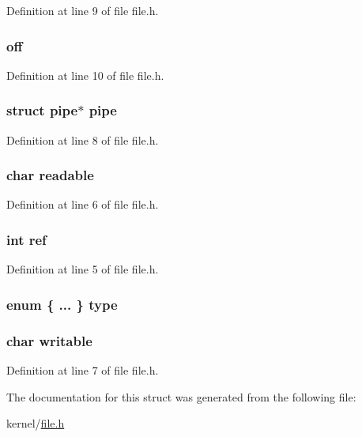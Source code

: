Definition at line 9 of file file.\-h.

\hypertarget{structfile_a1aeb2e4b0cfd549f8fb46fb7e08f7e3e}{
\subsubsection[{off}]{ off}}\label{structfile_a1aeb2e4b0cfd549f8fb46fb7e08f7e3e}


Definition at line 10 of file file.\-h.

\hypertarget{structfile_a1e1b96aa86c12eab7047388c6538c051}{
\subsubsection[{pipe}]{\setlength{\rightskip}{0pt plus 5cm}struct {\bf pipe}$\ast$ {\bf pipe}}}\label{structfile_a1e1b96aa86c12eab7047388c6538c051}


Definition at line 8 of file file.\-h.

\hypertarget{structfile_a5b131cc3952f1b648059bd61e2f49d99}{
\subsubsection[{readable}]{\setlength{\rightskip}{0pt plus 5cm}char readable}}\label{structfile_a5b131cc3952f1b648059bd61e2f49d99}


Definition at line 6 of file file.\-h.

\hypertarget{structfile_adb528a1cb1ca190150183394d082590d}{
\subsubsection[{ref}]{\setlength{\rightskip}{0pt plus 5cm}int ref}}\label{structfile_adb528a1cb1ca190150183394d082590d}


Definition at line 5 of file file.\-h.

\hypertarget{structfile_a2872497b673824bb97dd279fe716ce20}{
\subsubsection[{type}]{\setlength{\rightskip}{0pt plus 5cm}enum \{ ... \}   type}}\label{structfile_a2872497b673824bb97dd279fe716ce20}
\hypertarget{structfile_a46baf97119b7f82a588f0f603451da62}{
\subsubsection[{writable}]{\setlength{\rightskip}{0pt plus 5cm}char writable}}\label{structfile_a46baf97119b7f82a588f0f603451da62}


Definition at line 7 of file file.\-h.



The documentation for this struct was generated from the following file\-:\begin{DoxyCompactItemize}
\item 
kernel/\hyperlink{file_8h}{file.\-h}\end{DoxyCompactItemize}
